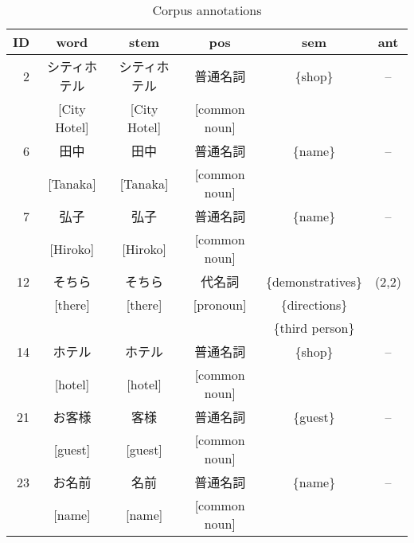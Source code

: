 \setlength{\tabcolsep}{5pt}
\begin{table}[hbt]
  \vspace*{-0.5\baselineskip}
   \begin{center}
   \begin{scriptsize}
    \caption{Corpus annotations}\label{tab-tag} 
    \vspace*{0.5em}
    \begin{tabular}{|r|c|c|c|c|c|}
      \hline
      ID & word         & stem          & pos           & sem                  & ant \\ \hline \hline
      2  & シティホテル & シティホテル  & 普通名詞      &  \{shop\}            & --    \\ [-0.5em]
         & [City Hotel] &  [City Hotel] & [common noun] &                      &       \\ \hline
      6  & 田中         & 田中          & 普通名詞      &  \{name\}            & --    \\ [-0.5em]
         & [Tanaka]     & [Tanaka]      & [common noun] &                      &       \\ \hline
      7  & 弘子         & 弘子          & 普通名詞      &  \{name\}            & --    \\ [-0.5em]
         & [Hiroko]     &[Hiroko]       & [common noun] &                      &       \\ \hline
      12 & そちら       & そちら        & 代名詞        &  \{demonstratives\}  & (2,2) \\ [-0.5em]
         & [there]      & [there]       & [pronoun]     &  \{directions\}      &       \\ [-0.5em]
         &              &               &               &  \{third person\}    &       \\ \hline
      14 & ホテル       & ホテル        & 普通名詞      &  \{shop\}            & --    \\ [-0.5em]
         & [hotel]      & [hotel]       & [common noun] &                      &       \\ \hline
      21 & お客様       & 客様          & 普通名詞      &  \{guest\}           & --    \\ [-0.5em]
         & [guest]      & [guest]       & [common noun] &                      &       \\ \hline
      23 & お名前       & 名前          & 普通名詞      &  \{name\}            & --    \\ [-0.5em]
         & [name]       & [name]        & [common noun] &                      &       \\ \hline

\end{tabular}
\end{scriptsize}
\end{center}
\end{table}
